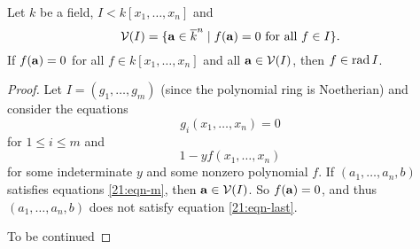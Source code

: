 \begin{thm}
  Let $k$ be a field, $I<k[x_1,\ldots,x_n]$ and
  \[ \mathcal{V}(I) = \{ \mathbf{a} \in \overline k^n \mid f(\mathbf{a}) = 0 \text{ for all } f \in I \}. \]
  If $f(\mathbf{a})=0$ for all $f \in k[x_1,\ldots,x_n]$ and all $\mathbf{a} \in \mathcal{V}(I)$, then $f \in \operatorname{rad} I$.
\end{thm}

\begin{proof}
  Let $I = (g_1,\ldots,g_m)$ (since the polynomial ring is Noetherian) and consider the equations
  \begin{equation}\label{21:eqn-m}
    g_i(x_1,\ldots,x_n)=0
  \end{equation}
  for $1 \leq i \leq m$ and
  \begin{equation}\label{21:eqn-last}
    1-yf(x_1,\ldots,x_n)
  \end{equation}
  for some indeterminate $y$ and some nonzero polynomial $f$.
  If $(a_1,\ldots,a_n,b)$ satisfies equations \ref{21:eqn-m}, then $\mathbf{a} \in \mathcal{V}(I)$.
  So $f(\mathbf{a})=0$, and thus $(a_1,\ldots,a_n,b)$ does not satisfy equation \ref{21:eqn-last}.

  To be continued
\end{proof}
